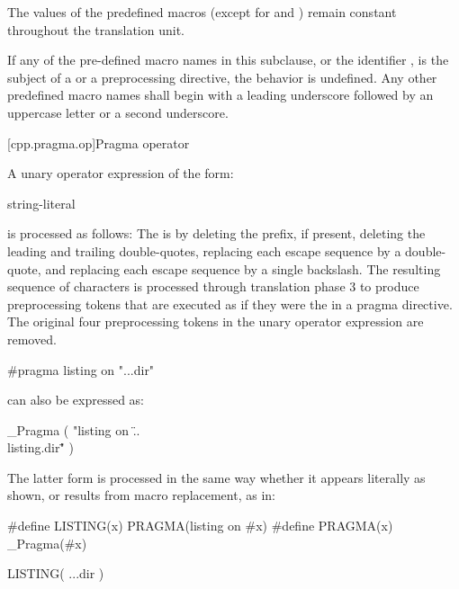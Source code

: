 \pnum
The values of the predefined macros
(except for
and
)
remain constant throughout the translation unit.

\pnum
If any of the pre-defined macro names in this subclause,
or the identifier
,
is the subject of a
or a
preprocessing directive,
the behavior is undefined.
Any other predefined macro names shall begin with a
leading underscore followed by an uppercase letter or a second
underscore.

[cpp.pragma.op]{Pragma operator}%
%

\pnum
A unary operator expression of the form:
\begin{ncbnf}
 \terminal{(} string-literal \terminal{)}
\end{ncbnf}
is processed as follows: The  is 
by deleting the  prefix, if present, deleting the leading and trailing
double-quotes, replacing each escape sequence  by a double-quote, and
replacing each escape sequence \tcode{\textbackslash\textbackslash} by a single
backslash. The resulting sequence of characters is processed through translation phase 3
to produce preprocessing tokens that are executed as if they were the
 in a pragma directive. The original four preprocessing
tokens in the unary operator expression are removed.

\pnum
\begin{example}
\begin{codeblock}
#pragma listing on "..\listing.dir"
\end{codeblock}
can also be expressed as:
\begin{codeblock}
_Pragma ( "listing on \"..\\listing.dir\"" )
\end{codeblock}
The latter form is processed in the same way whether it appears literally
as shown, or results from macro replacement, as in:
\begin{codeblock}
#define LISTING(x) PRAGMA(listing on #x)
#define PRAGMA(x) _Pragma(#x)

LISTING( ..\listing.dir )
\end{codeblock}
\end{example}
